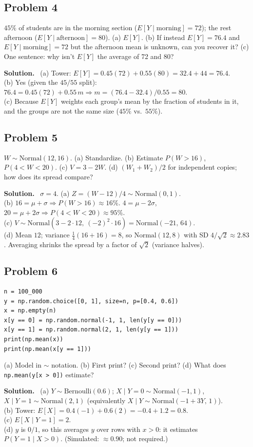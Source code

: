 \documentclass[11pt]{article}
\newcommand{\Bern}{\text{Bernoulli}}
\newcommand{\Norm}{\text{Normal}}
\newcommand{\py}[1]{\texttt{#1}}
\newenvironment{soln}{\par\smallskip\noindent\textbf{Solution.}\ }{\par\medskip}
\begin{document}
\subsection*{Problem 4}
$45\%$ of students are in the morning section ($E[Y\mid\text{morning}]=72$); the rest afternoon ($E[Y\mid\text{afternoon}]=80$). (a) $E[Y]$. (b) If instead $E[Y]=76.4$ and $E[Y\mid\text{morning}]=72$ but the afternoon mean is unknown, can you recover it? (c) One sentence: why isn't $E[Y]$ the average of 72 and 80?
\begin{soln}
(a) Tower: $E[Y]=0.45(72)+0.55(80)=32.4+44=76.4$.\\
(b) Yes (given the $45/55$ split): $76.4=0.45(72)+0.55\,m\Rightarrow m=(76.4-32.4)/0.55=80$.\\
(c) Because $E[Y]$ weights each group's mean by the fraction of students in it, and the groups are not the same size ($45\%$ vs.\ $55\%$).
\end{soln}

\subsection*{Problem 5}
$W\sim\Norm(12,16)$. (a) Standardize. (b) Estimate $P(W>16)$, $P(4<W<20)$. (c) $V=3-2W$. (d) $(W_1+W_2)/2$ for independent copies; how does its spread compare?
\begin{soln}
$\sigma=4$. (a) $Z=(W-12)/4\sim\Norm(0,1)$.\\
(b) $16=\mu+\sigma\Rightarrow P(W>16)\approx16\%$. $4=\mu-2\sigma$, $20=\mu+2\sigma\Rightarrow P(4<W<20)\approx95\%$.\\
(c) $V\sim\Norm(3-2\cdot12,\ (-2)^2\cdot16)=\Norm(-21,\,64)$.\\
(d) Mean $12$; variance $\frac14(16+16)=8$, so $\Norm(12,8)$ with SD $4/\sqrt2\approx2.83$. Averaging shrinks the spread by a factor of $\sqrt2$ (variance halves).
\end{soln}

\subsection*{Problem 6}
\begin{lstlisting}
n = 100_000
y = np.random.choice([0, 1], size=n, p=[0.4, 0.6])
x = np.empty(n)
x[y == 0] = np.random.normal(-1, 1, len(y[y == 0]))
x[y == 1] = np.random.normal(2, 1, len(y[y == 1]))
print(np.mean(x))
print(np.mean(x[y == 1]))
\end{lstlisting}
(a) Model in $\sim$ notation. (b) First print? (c) Second print? (d) What does \py{np.mean(y[x > 0])} estimate?
\begin{soln}
(a) $Y\sim\Bern(0.6)$; $X\mid Y{=}0\sim\Norm(-1,1)$, $X\mid Y{=}1\sim\Norm(2,1)$ (equivalently $X\mid Y\sim\Norm(-1+3Y,\,1)$).\\
(b) Tower: $E[X]=0.4(-1)+0.6(2)=-0.4+1.2=0.8$.\\
(c) $E[X\mid Y{=}1]=2$.\\
(d) $y$ is $0/1$, so this averages $y$ over rows with $x>0$: it estimates $P(Y{=}1\mid X>0)$. (Simulated: $\approx0.90$; not required.)
\end{soln}
\end{document}
